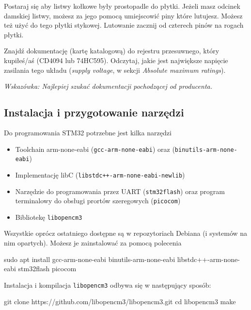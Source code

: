 \documentclass{pdfBooklets}
\begin{document}
Postaraj się aby listwy kołkowe były prostopadle do płytki. Jeżeli masz odcinek damskiej listwy, możesz za jego pomocą
umiejscowić piny które lutujesz. Możesz też użyć do tego płytki stykowej. Lutowanie zacznij od czterech pinów na rogach płytki.

\begin{Zadanie}{}{}
  Znajdź dokumentację (kartę katalogową) do rejestru przesuwnego, który kupiłeś/aś (CD4094 lub 74HC595).
  Odczytaj, jakie jest największe napięcie zasilania tego układu (\textit{supply voltage}, w sekcji
  \textit{Absolute maximum ratings}).

  \textit{Wskazówka: Najlepiej szukać dokumentacji pochodzącej od producenta.}
\end{Zadanie}




\subsection{Instalacja i przygotowanie narzędzi}

Do programowania STM32 potrzebne jest kilka narzędzi

\begin{itemize}
  \item Toolchain arm-none-eabi (\Verb$gcc-arm-none-eabi$) oraz (\Verb$binutils-arm-none-eabi$)
  \item Implementację libC (\Verb$libstdc++-arm-none-eabi-newlib$)
  \item Narzędzie do programowania przez UART (\Verb$stm32flash$) oraz program terminalowy do obsługi prortów szeregowych (\Verb$picocom$)
  \item Bibliotekę \Verb$libopencm3$
\end{itemize}
Wszystkie oprócz ostatniego dostępne są w repozytoriach Debiana (i systemów na nim opartych). Możesz je zainstalować
za pomocą polecenia

\begin{CodeFrame*}[bash]{}
sudo apt install gcc-arm-none-eabi binutils-arm-none-eabi libstdc++-arm-none-eabi stm32flash picocom
\end{CodeFrame*}

Instalacja i kompilacja \Verb$libopencm3$ odbywa się w następujący sposób:

\begin{CodeFrame*}[bash]{}
git clone https://github.com/libopencm3/libopencm3.git
cd libopencm3
make
\end{CodeFrame*}
\end{document}

